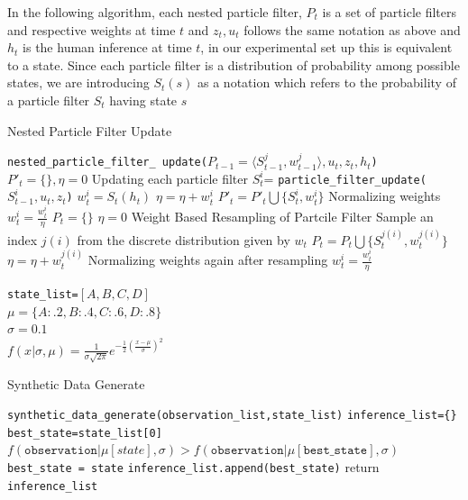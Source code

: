 \documentclass[12pt,letterpaper]{article}
\begin{document}
\begin{algorithm}[h!]
In the following algorithm, each nested particle filter, $P_t$ is a set of particle filters and respective weights at time $t$ and $z_t,u_t$ follows the same notation as above and $h_t$ is the human inference at time $t$, in our experimental set up this is equivalent to a state. Since each particle filter is a distribution of probability among possible states, we are introducing $S_t(s)$ as a notation which refers to the probability of a particle filter $S_t$ having state $s$
   \caption{Nested Particle Filter Update}
    \begin{algorithmic}[1]
      \Function\texttt{nested\_particle\_filter\_ update($P_{t-1}=\langle S_{t-1}^{j},w_{t-1}^{j}\rangle,u_t,z_t,h_t$)}
        \State $P'_t =\{\},\eta = 0$
         \hspace{6mm} Updating each particle filter
            \State $S_t^i$= \texttt{particle\_filter\_update({$S_{t-1}^i,u_t,z_t$})} 
            \State $w_t^i=S_t(h_t)$
            \State $\eta = \eta + w_t^i $
            \State $P'_t = P'_t\bigcup \{S_t^i,w_t^{i}\}$
        \EndFor
         \hspace{6mm} Normalizing weights
            \State $w_t^i=\frac{w_t^i}{\eta}$
        \EndFor
        \State $P_t=\{\}$
        \State $\eta=0$
         \hspace{6mm} Weight Based Resampling of Partcile Filter
            \State Sample an index $j(i)$ from the discrete distribution given by $w_{t}$
            \State $P_t = P_t\bigcup \{S_t^{j(i)},w_t^{j(i)}\}$
            \State $\eta = \eta + w_t^{j(i)}$
        \EndFor
         \hspace{6mm} Normalizing weights again after resampling 
            \State $w_t^i=\frac{w_t^i}{\eta}$
        \EndFor
    \EndFunction    
    \end{algorithmic}
\end{algorithm}

\begin{algorithm} [h!]
\texttt{state\_list=$[A,B,C,D]$}\\
$\mu = \{A:.2,B:.4,C:.6,D:.8\}$\\
$\sigma = 0.1$\\
$f(x|\sigma,\mu)={\frac {1}{\sigma {\sqrt {2\pi }}}}e^{-{\frac {1}{2}}\left({\frac {x-\mu }{\sigma }}\right)^{2}}$
\caption{Synthetic Data Generate}
\begin{algorithmic}[1a]
  \Function\texttt{synthetic\_data\_generate(observation\_list,state\_list)}
    \State \texttt{inference\_list=\{\}}
      \State \texttt{best\_state=state\_list[0]}
        \If $f(\texttt{observation}|\mu[state],\sigma)>f(\texttt{observation}|\mu[\texttt{best\_state}],\sigma)$
          \State \texttt{best\_state = state}
        \EndIf
       \EndFor
        \State\texttt{inference\_list.append(best\_state)}
     \EndFor
    \State return \texttt{inference\_list}
    \EndFunction   
\end{algorithmic}
\end{algorithm}
\end{document}
